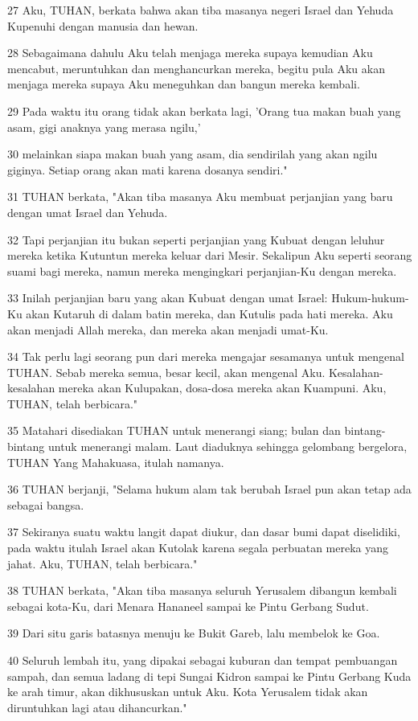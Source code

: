 \par 27 Aku, TUHAN, berkata bahwa akan tiba masanya negeri Israel dan Yehuda Kupenuhi dengan manusia dan hewan.
\par 28 Sebagaimana dahulu Aku telah menjaga mereka supaya kemudian Aku mencabut, meruntuhkan dan menghancurkan mereka, begitu pula Aku akan menjaga mereka supaya Aku meneguhkan dan bangun mereka kembali.
\par 29 Pada waktu itu orang tidak akan berkata lagi, 'Orang tua makan buah yang asam, gigi anaknya yang merasa ngilu,'
\par 30 melainkan siapa makan buah yang asam, dia sendirilah yang akan ngilu giginya. Setiap orang akan mati karena dosanya sendiri."
\par 31 TUHAN berkata, "Akan tiba masanya Aku membuat perjanjian yang baru dengan umat Israel dan Yehuda.
\par 32 Tapi perjanjian itu bukan seperti perjanjian yang Kubuat dengan leluhur mereka ketika Kutuntun mereka keluar dari Mesir. Sekalipun Aku seperti seorang suami bagi mereka, namun mereka mengingkari perjanjian-Ku dengan mereka.
\par 33 Inilah perjanjian baru yang akan Kubuat dengan umat Israel: Hukum-hukum-Ku akan Kutaruh di dalam batin mereka, dan Kutulis pada hati mereka. Aku akan menjadi Allah mereka, dan mereka akan menjadi umat-Ku.
\par 34 Tak perlu lagi seorang pun dari mereka mengajar sesamanya untuk mengenal TUHAN. Sebab mereka semua, besar kecil, akan mengenal Aku. Kesalahan-kesalahan mereka akan Kulupakan, dosa-dosa mereka akan Kuampuni. Aku, TUHAN, telah berbicara."
\par 35 Matahari disediakan TUHAN untuk menerangi siang; bulan dan bintang-bintang untuk menerangi malam. Laut diaduknya sehingga gelombang bergelora, TUHAN Yang Mahakuasa, itulah namanya.
\par 36 TUHAN berjanji, "Selama hukum alam tak berubah Israel pun akan tetap ada sebagai bangsa.
\par 37 Sekiranya suatu waktu langit dapat diukur, dan dasar bumi dapat diselidiki, pada waktu itulah Israel akan Kutolak karena segala perbuatan mereka yang jahat. Aku, TUHAN, telah berbicara."
\par 38 TUHAN berkata, "Akan tiba masanya seluruh Yerusalem dibangun kembali sebagai kota-Ku, dari Menara Hananeel sampai ke Pintu Gerbang Sudut.
\par 39 Dari situ garis batasnya menuju ke Bukit Gareb, lalu membelok ke Goa.
\par 40 Seluruh lembah itu, yang dipakai sebagai kuburan dan tempat pembuangan sampah, dan semua ladang di tepi Sungai Kidron sampai ke Pintu Gerbang Kuda ke arah timur, akan dikhususkan untuk Aku. Kota Yerusalem tidak akan diruntuhkan lagi atau dihancurkan."

